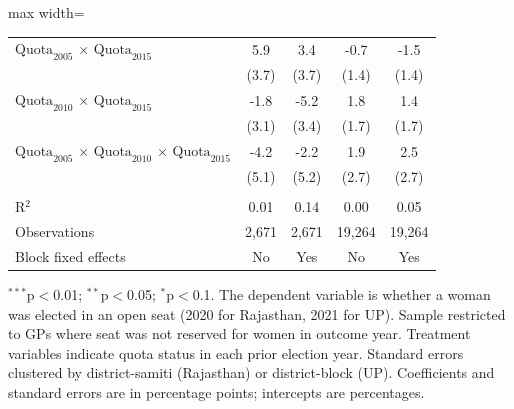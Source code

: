\begin{adjustbox}{max width=\linewidth}
\begin{threeparttable}[b]
\begin{tabular}{lcccc}
         $\text{Quota}_{2005}$ $\times$ $\text{Quota}_{2015}$                                     & 5.9         & 3.4         & -0.7         & -1.5\\
                                                                                                  & (3.7)       & (3.7)       & (1.4)        & (1.4)\\
         $\text{Quota}_{2010}$ $\times$ $\text{Quota}_{2015}$                                     & -1.8        & -5.2        & 1.8          & 1.4\\
                                                                                                  & (3.1)       & (3.4)       & (1.7)        & (1.7)\\
         $\text{Quota}_{2005}$ $\times$ $\text{Quota}_{2010}$ $\times$ $\text{Quota}_{2015}$      & -4.2        & -2.2        & 1.9          & 2.5\\
                                                                                                  & (5.1)       & (5.2)       & (2.7)        & (2.7)\\
          \\
         R$^2$                                                                                    & 0.01        & 0.14        & 0.00         & 0.05\\
         Observations                                                                             & 2,671       & 2,671       & 19,264       & 19,264\\
         Block fixed effects                                                                      & No          & Yes         & No           & Yes\\
         \bottomrule
      \end{tabular}

      \begin{tablenotes}
         \item $^{***}$p$<$0.01; $^{**}$p$<$0.05; $^{*}$p$<$0.1. The dependent variable is whether a woman was elected in an open seat (2020 for Rajasthan, 2021 for UP). Sample restricted to GPs where seat was not reserved for women in outcome year. Treatment variables indicate quota status in each prior election year. Standard errors clustered by district-samiti (Rajasthan) or district-block (UP). Coefficients and standard errors are in percentage points; intercepts are percentages.
      \end{tablenotes}
   \end{threeparttable}
\end{adjustbox}
\par\endgroup


